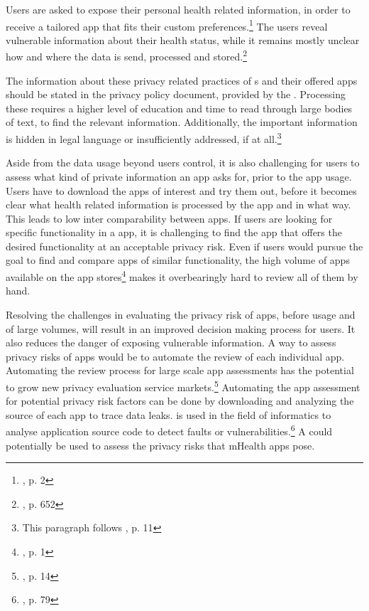 \documentclass[
	a4paper,
	oneside,
	12pt,
	liststotocnumbered
]{article}
\let\cite\textcite
\begin{document}
Users are asked to expose their personal health related information, in order to receive a tailored app that fits their custom preferences.\footnote{\cite{Chen2012}, p. 2}
The users reveal vulnerable information about their health status, while it remains mostly unclear how and where the data is send, processed and stored.\footnote{\cite{He2014a}, p. 652}

The information about these privacy related practices of \ap s and their offered apps should be stated in the privacy policy document, provided by the \ap.
Processing these \pps requires a higher level of education and time to read through large bodies of text, to find the relevant information. 
Additionally, the important information is hidden in legal language or insufficiently addressed, if at all.\footnote{This paragraph follows \cite{Dehling2014}, p. 11}

Aside from the data usage beyond users control, it is also challenging for users to assess what kind of private information an app asks for, prior to the app usage. 
Users have to download the apps of interest and try them out, before it becomes clear what health related information is processed by the app and in what way. 
This leads to low inter comparability between apps. 
If users are looking for specific functionality in a \mH app, it is challenging to find the app that offers the desired functionality at an acceptable privacy risk. 
Even if users would pursue the goal to find and compare \mH apps of similar functionality, the high volume of apps available on the app stores\footnote{\cite{Enck2011}, p. 1} makes it overbearingly hard to review all of them by hand.

Resolving the challenges in evaluating the privacy risk of \mH apps, before usage and of large volumes, will result in an improved decision making process for users. 
It also reduces the danger of exposing vulnerable information. 
A way to assess privacy risks of \mH apps would be to automate the review of each individual app. 
Automating the review process for large scale app assessments has the potential to grow new privacy evaluation service markets.\footnote{\cite{Enck2011}, p. 14}
Automating the app assessment for potential privacy risk factors  can be done by downloading and analyzing the source of each app to trace data leaks. 
\Sca is used in the field of informatics to analyse application source code to detect faults or vulnerabilities.\footnote{\cite{Baca2008}, p. 79} 
A \sca could potentially be used to assess the privacy risks that mHealth apps pose.
\end{document}

